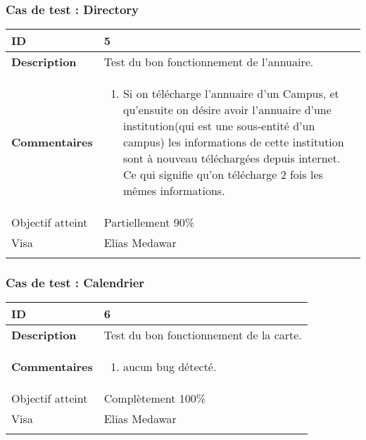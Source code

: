 		 		 \subsubsection*{Cas de test : Directory}
		 		 		 		 		 \begin{longtable}{m{4cm}|p{10cm}|}
		 		 		 		 		 \textbf{ ID} & 5 \\
		 		 		 		 		 \hline \textbf{Description} &  Test du bon fonctionnement de l'annuaire.\\
		 		 		 		 		 \hline \textbf{Commentaires} &  
		 		 		 		 		 	 	 \begin{enumerate}
					 		 	 		 		 		 	 		\item Si on télécharge l'annuaire d'un Campus, et qu'ensuite on désire avoir l'annuaire d'une institution(qui est une sous-entité d'un campus) les informations de cette institution sont à nouveau téléchargées depuis internet. Ce qui signifie qu'on télécharge 2 fois les mêmes informations.
					 		 	 		 					 	\end{enumerate} \\
		 		 	 		 		 		 \hline Objectif atteint & {\color{orange} Partiellement 90\% \XBox } \\
					 		 	 		 		 		\hline Visa & Elias Medawar 	\\
					 		 		 		 		\\
		 		 		 		 \end{longtable}

		 		 \subsubsection*{Cas de test : Calendrier}
		 		 		 		 		 \begin{longtable}{m{4cm}|p{10cm}|}
		 		 		 		 		 \textbf{ ID} & 6 \\
		 		 		 		 		 \hline \textbf{Description} &  Test du bon fonctionnement de la carte.\\
		 		 		 		 		 \hline \textbf{Commentaires} &  
		 		 		 		 		 	 	 \begin{enumerate}
					 		 	 		 		 		 	 		\item aucun bug détecté.
					 		 	 		 					 	\end{enumerate} \\
		 		 	 		 		 		 \hline Objectif atteint & {\color{green} Complètement 100\% \CheckedBox } \\
					 		 	 		 		 		\hline Visa & Elias Medawar 	\\
					 		 		 		 		\\
		 		 		 		 \end{longtable} 


